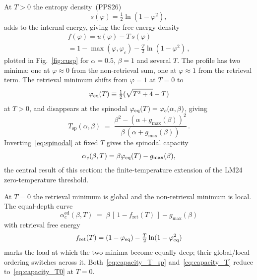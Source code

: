 \documentclass[letterpaper]{article} %
\newcommand{\Bnet}{\beta}
\newcommand{\fret}{f_{\mathrm{ret}}}
\newcommand{\gmax}{g_{\max}}
\newcommand{\ac}{\alpha_c}
\newcommand{\acEd}{\alpha_c^{\mathrm{ed}}}
\begin{document}
At $T > 0$ the entropy density~(PPS26)
\begin{equation}
    s(\varphi) = \tfrac{1}{2} \ln(1 - \varphi^2),
    \label{eq:entropy}
\end{equation}
adds to the internal energy, giving the free energy density 
\begin{multline}
    f(\varphi) = u(\varphi) - T\,s(\varphi) \\= 1 -\max(\varphi, \varphi_c) - \tfrac{T}{2}\ln(1-\varphi^2)\,,
    \label{eq:free_en}
\end{multline}
plotted in  Fig.~\ref{fig:cusp} for $\alpha = 0.5$, $\Bnet = 1$ and several $T$. The profile has two minima: one at $\varphi \approx 0$ from the non-retrieval sum, one at $\varphi \approx 1$ from the retrieval term. The retrieval minimum shifts from $\varphi = 1$ at $T = 0$ to
\begin{equation}
    \varphi_{\rm eq}(T) \equiv \tfrac{1}{2}(\sqrt{T^2 + 4} - T)
    \label{eq:phi_eq}
\end{equation}
at $T > 0$, and disappears at the spinodal
$\varphi_{\rm eq}(T) = \varphi_c(\alpha, \Bnet)$, giving
\begin{equation}
    T_{\mathrm{sp}}(\alpha, \Bnet) \;=\; \frac{\Bnet^2 - (\alpha + \gmax(\Bnet))^2}
              {\Bnet\,(\alpha + \gmax(\Bnet))}\,.
    \label{eq:spinodal}
\end{equation}
Inverting~\eqref{eq:spinodal} at fixed $T$ gives the spinodal capacity
\begin{equation}
    \ac(\Bnet, T) = \Bnet \varphi_{\rm eq}(T) - g_{\max}(\Bnet),
    \label{eq:capacity_T_sp}
\end{equation}
the central result of this section: the finite-temperature extension of the LM24 zero-temperature threshold.

At $T = 0$ the retrieval minimum is global and the non-retrieval minimum is local. The equal-depth curve
\begin{equation}
    \acEd(\Bnet, T) \;=\; \Bnet\,[\,1 - \fret(T)\,] - g_{\max}(\Bnet)
    \label{eq:capacity_T}
\end{equation}
with retrieval free energy
\begin{equation}
    \fret(T) = (1 - \varphi_{\rm eq}) - \tfrac{T}{2}\ln(1 - \varphi_{\rm eq}^2)
\end{equation}
marks the load at which the two minima become equally deep; their global/local ordering switches across it. Both~\eqref{eq:capacity_T_sp} and~\eqref{eq:capacity_T} reduce to~\eqref{eq:capacity_T0} at $T = 0$.
\end{document}
